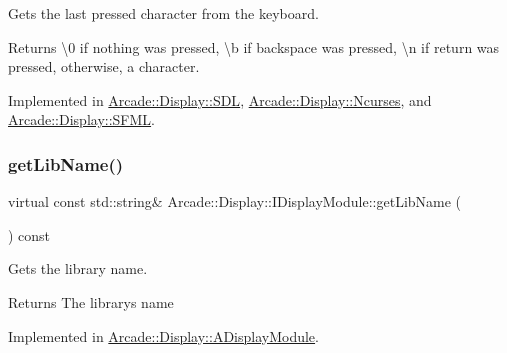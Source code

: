 Gets the last pressed character from the keyboard. 

\begin{DoxyReturn}{Returns}
\textbackslash{}0 if nothing was pressed, \textbackslash{}b if backspace was pressed, \textbackslash{}n if return was pressed, otherwise, a character. 
\end{DoxyReturn}


Implemented in \mbox{\hyperlink{classArcade_1_1Display_1_1SDL_a3ba94b49b72c9e189f52af7b97f4ad91}{Arcade\+::\+Display\+::\+S\+DL}}, \mbox{\hyperlink{classArcade_1_1Display_1_1Ncurses_a250dbb0610f79a7524ba5a926be750b6}{Arcade\+::\+Display\+::\+Ncurses}}, and \mbox{\hyperlink{classArcade_1_1Display_1_1SFML_ae2bf9e9c157a9f0ae8d1b60bd072e881}{Arcade\+::\+Display\+::\+S\+F\+ML}}.

\mbox{\label{classArcade_1_1Display_1_1IDisplayModule_a0d8e957815e94766bdefbd7a5043e81a}} 
\subsubsection{\texorpdfstring{getLibName()}{getLibName()}}
{\footnotesize\ttfamily virtual const std\+::string\& Arcade\+::\+Display\+::\+I\+Display\+Module\+::get\+Lib\+Name (\begin{DoxyParamCaption}{ }\end{DoxyParamCaption}) const\hspace{0.3cm}{\ttfamily [pure virtual]}}



Gets the library name. 

\begin{DoxyReturn}{Returns}
The library\textquotesingle{}s name 
\end{DoxyReturn}


Implemented in \mbox{\hyperlink{classArcade_1_1Display_1_1ADisplayModule_a0f7d98b279058994f41978b17bb14222}{Arcade\+::\+Display\+::\+A\+Display\+Module}}.

\mbox{\label{classArcade_1_1Display_1_1IDisplayModule_af871661ff84c21581cd7233ba6f27aa0}} 
